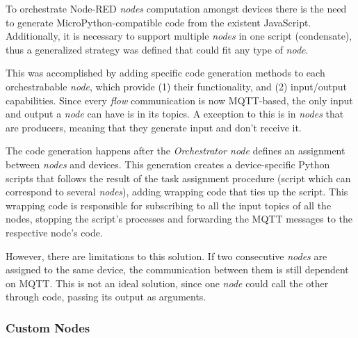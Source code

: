 To orchestrate Node-RED \textit{nodes} computation amongst devices there is the need to generate MicroPython-compatible code from the existent JavaScript. Additionally, it is necessary to support multiple \textit{nodes} in one script (\ie condensate), thus a generalized strategy was defined that could fit any type of \textit{node}.

This was accomplished by adding specific code generation methods to each orchestrabable \textit{node}, which provide (1) their functionality, and (2) input/output capabilities. Since every \textit{flow} communication is now MQTT-based, the only input and output a \textit{node} can have is in its topics. A exception to this is in \textit{nodes} that are producers, meaning that they generate input and don't receive it. 

The code generation happens after the \textit{Orchestrator node} defines an assignment between \textit{nodes} and devices. This generation creates a device-specific Python scripts that follows the result of the task assignment procedure (script which can correspond to several \textit{nodes}), adding wrapping code that ties up the script. This wrapping code is responsible for subscribing to all the input topics of all the nodes, stopping the script's processes and forwarding the MQTT messages to the respective node's code.


However, there are limitations to this solution. If two consecutive \textit{nodes} are assigned to the same device, the communication between them is still dependent on MQTT. This is not an ideal solution, since one \textit{node} could call the other through code, passing its output as arguments.

\subsubsection{Custom Nodes}\label{sec:custom_nodes}

